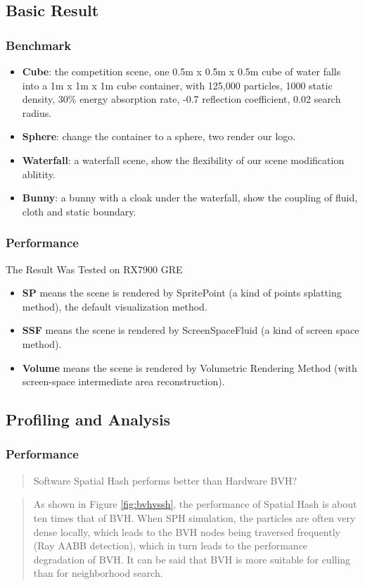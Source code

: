 
\subsection{Basic Result}
\begin{frame}
    \frametitle{Benchmark}
    \begin{itemize}
        \item \textbf{Cube}: the competition scene, one 0.5m x 0.5m x 0.5m cube of water falls into a 1m x 1m x 1m cube container, with 125,000 particles, 1000 static density, 30\% energy absorption rate, -0.7 reflection coefficient, 0.02 search radius.
        \item \textbf{Sphere}: change the container to a sphere, two render our logo.
        \item \textbf{Waterfall}: a waterfall scene, show the flexibility of our scene modification ablitity.
        \item \textbf{Bunny}: a bunny with a cloak under the waterfall, show the coupling of fluid, cloth and static boundary.
    \end{itemize}
\end{frame}

\begin{frame}
    \frametitle{Performance}
    The Result Was Tested on RX7900 GRE
    
    \begin{itemize}
        \item \textbf{SP} means the scene is rendered by SpritePoint (a kind of points splatting method), the default visualization method.
        \item \textbf{SSF} means the scene is rendered by ScreenSpaceFluid (a kind of screen space method).
        \item \textbf{Volume} means the scene is rendered by Volumetric Rendering Method (with screen-space intermediate area reconstruction).
    \end{itemize}
\end{frame}

\subsection{Profiling and Analysis}

\begin{frame}
    \frametitle{Performance}
    \begin{quote}
        Software Spatial Hash performs better than Hardware BVH?
    \end{quote}
    
    \begin{quote}
        As shown in Figure \ref{fig:bvhvssh}, the performance of Spatial Hash is about ten times that of BVH. When SPH simulation, the particles are often very dense locally, which leads to the BVH nodes being traversed frequently (Ray AABB detection), which in turn leads to the performance degradation of BVH. It can be said that BVH is more suitable for culling than for neighborhood search.
    \end{quote}
\end{frame}

